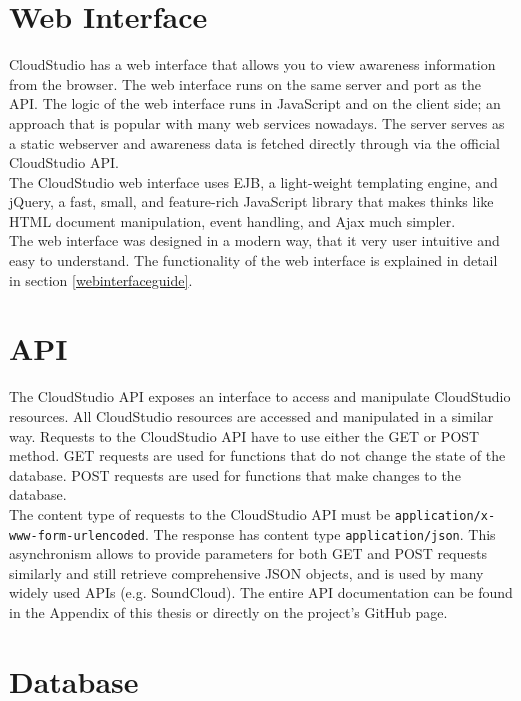 \section{Web Interface}

CloudStudio has a web interface that allows you to view awareness information from the browser. The web interface runs on the same server and port as the API. The logic of the web interface runs in JavaScript and on the client side; an approach that is popular with many web services nowadays. The server serves as a static webserver and awareness data is fetched directly through via the official CloudStudio API. \\

The CloudStudio web interface uses EJB, a light-weight templating engine, and jQuery, a fast, small, and feature-rich JavaScript library that makes thinks like HTML document manipulation, event handling, and Ajax much simpler. \\

The web interface was designed in a modern way, that it very user intuitive and easy to understand. The functionality of the web interface is explained in detail in section \ref{webinterfaceguide}.



\section{API}

The CloudStudio API exposes an interface to access and manipulate CloudStudio resources. All CloudStudio resources are accessed and manipulated in a similar way. Requests to the CloudStudio API have to use either the GET or POST method. GET requests are used for functions that do not change the state of the database. POST requests are used for functions that make changes to the database. \\

The content type of requests to the CloudStudio API must be \texttt{application/x-www-form-urlencoded}. The response has content type \texttt{application/json}. This asynchronism allows to provide parameters for both GET and POST requests similarly and still retrieve comprehensive JSON objects, and is used by many widely used APIs (e.g. SoundCloud). The entire API documentation can be found in the Appendix of this thesis or directly on the project's GitHub page.



\section{Database}\label{database}

